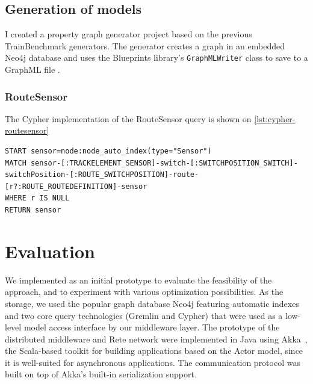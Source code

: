 \section{Generation of models}

I created a property graph generator project based on the previous TrainBenchmark generators. The generator creates a graph in an embedded Neo4j database and uses the Blueprints library's \texttt{GraphMLWriter} class to save to a GraphML file \cite{Blueprints}.

\subsection{RouteSensor}

The Cypher implementation of the RouteSensor query is shown on \autoref{lst:cypher-routesensor}

\begin{lstlisting}[caption=Cyper query for the RouteSensor test case, label=lst:cypher-routesensor, breaklines=true]
START sensor=node:node_auto_index(type="Sensor")
MATCH sensor-[:TRACKELEMENT_SENSOR]-switch-[:SWITCHPOSITION_SWITCH]-switchPosition-[:ROUTE_SWITCHPOSITION]-route-[r?:ROUTE_ROUTEDEFINITION]-sensor
WHERE r IS NULL
RETURN sensor
\end{lstlisting}

\chapter{Evaluation}
\label{sec:evaluation}


We implemented \iqd{} as an initial prototype to evaluate the feasibility of the approach, and to experiment with various optimization possibilities. As the storage, we used the popular graph database Neo4j \cite{neo4j} featuring automatic indexes and two core query technologies (Gremlin and Cypher) that were used as a low-level model access interface by our middleware layer. %
The prototype of the distributed middleware and Rete network were implemented in Java using Akka~\cite{akka}, the Scala-based toolkit for building applications based on the Actor model, since it is well-suited for asynchronous applications. The communication protocol was built on top of Akka's built-in serialization support.



